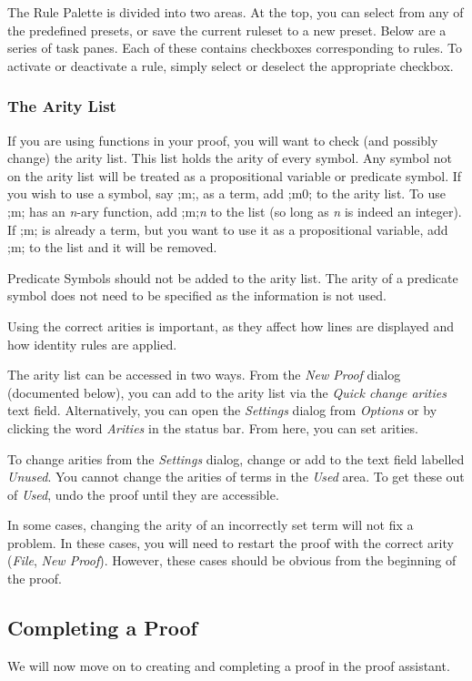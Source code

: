 \documentclass[a4paper]{article}
\begin{document}
The Rule Palette is divided into two areas. At the top, you can select from any of the predefined presets, or save the current ruleset to a new preset. Below are a series of task panes. Each of these contains checkboxes corresponding to rules. To activate or deactivate a rule, simply select or deselect the appropriate checkbox.

\subsubsection{The Arity List}
\label{subsubsec:ArityList}
If you are using functions in your proof, you will want to check (and possibly change) the arity list. This list holds the arity of every symbol. Any symbol not on the arity list will be treated as a propositional variable or predicate symbol. If you wish to use a symbol, say ;m;, as a term, add ;m0; to the arity list. To use ;m; has an \emph{n}-ary function, add ;m;\emph{n} to the list (so long as \emph{n} is indeed an integer). If ;m; is already a term, but you want to use it as a propositional variable, add ;m; to the list and it will be removed.

Predicate Symbols should not be added to the arity list. The arity of a predicate symbol does not need to be specified as the information is not used.

Using the correct arities is important, as they affect how lines are displayed and how identity rules are applied.

The arity list can be accessed in two ways. From the \emph{New Proof} dialog (documented below), you can add to the arity list via the \emph{Quick change arities} text field. Alternatively, you can open the \emph{Settings} dialog from \emph{Options} or by clicking the word \emph{Arities} in the status bar. From here, you can set arities.

To change arities from the \emph{Settings} dialog, change or add to the text field labelled \emph{Unused}. You cannot change the arities of terms in the \emph{Used} area. To get these out of \emph{Used}, undo the proof until they are accessible.

In some cases, changing the arity of an incorrectly set term will not fix a problem. In these cases, you will need to restart the proof with the correct arity (\emph{File}, \emph{New Proof}). However, these cases should be obvious from the beginning of the proof.

\subsection{Completing a Proof}
We will now move on to creating and completing a proof in the proof assistant.
\end{document}

